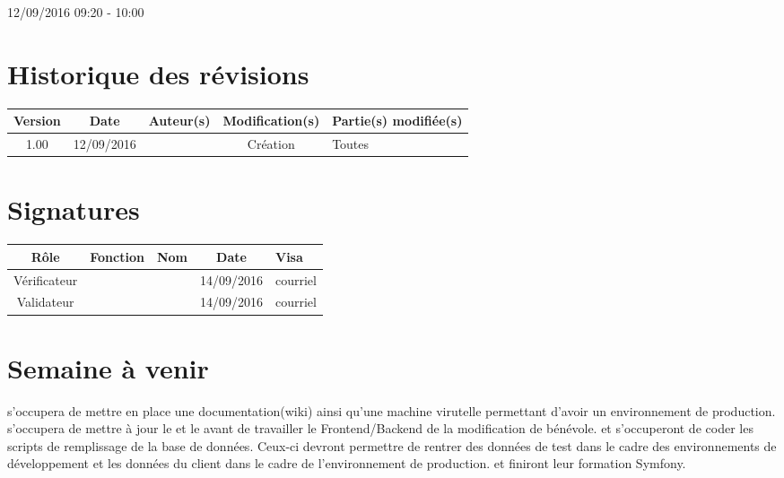\documentclass [a4paper] {article}
\begin{document}
12/09/2016			 				%
\hfill   
\hfill 	 09:20 - 10:00				%



\section*{Historique des révisions}
\begin{center}
			\begin{tabular}{| c | c | c | c | p{4cm} |}
				\hline
				\rowcolor{Gray}
				Version & Date & Auteur(s) & Modification(s) & Partie(s) modifiée(s)		 \\
				\hline
				1.00 & 12/09/2016 & \Kafui & Création & Toutes \\
		\hline		
			\end{tabular}
		\end{center}

\section*{Signatures}

		\begin{center}
			\begin{tabular}{| c | c | c | c | p{4cm} |}
				\hline
				\rowcolor{Gray}
				Rôle & Fonction & Nom & Date & Visa		 \\
				\hline
				Vérificateur & \RQ & \Melissa & 14/09/2016 & courriel \\[30pt]
				\hline
				Validateur & \CP & \Pierre & 14/09/2016 & courriel \\[30pt]	
				\hline
			\end{tabular}
		\end{center}

\section{Semaine à venir}
\Matthieu{} s'occupera de mettre en place une documentation(wiki) ainsi qu'une machine virutelle permettant d'avoir un environnement de production. \Kafui{} s'occupera de mettre à jour le \PQ{}  et le \PGC{} avant de travailler le Frontend/Backend de la modification de bénévole. \Melissa{} et \Julie{} s'occuperont de coder les scripts de remplissage de la base de données. Ceux-ci devront permettre de rentrer des données de test dans le cadre des environnements de développement et les données du client dans le cadre de l'environnement de production. \Francois{} et \Juliana{} finiront leur formation Symfony.






\end{document}
